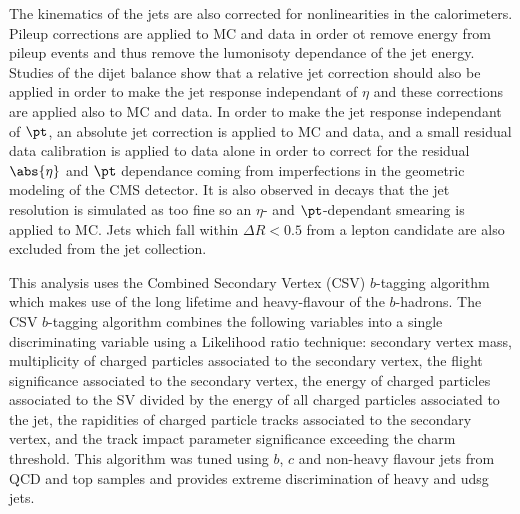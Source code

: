 The kinematics of the jets are also corrected for nonlinearities 
in the calorimeters.
Pileup corrections are applied to MC and data in order ot remove 
energy from pileup events and thus remove the lumonisoty dependance 
of the jet energy.
Studies of the dijet balance show that a relative jet correction 
should also be applied in order to make the jet response independant
of $\eta$ and these corrections are applied also to MC and data.
In order to make the jet response independant of $\pt$, an absolute
jet correction is applied to MC and data, and a small residual 
data calibration is applied to data alone in order to correct for the 
residual $\abs{\eta}$ and $\pt$ dependance coming from imperfections
in the geometric modeling of the CMS detector.
It is also observed in \MyZ  decays that the jet resolution is 
simulated as too fine so an $\eta$- and $\pt$-dependant smearing
is applied to MC. Jets which fall within $\Delta R < 0.5$ from a lepton candidate 
are also excluded from the jet collection.

This analysis uses the Combined Secondary Vertex (CSV) $b$-tagging algorithm which makes use 
of the long lifetime and heavy-flavour of the $b$-hadrons.  
The CSV $b$-tagging algorithm combines the following variables into a single discriminating 
variable using a Likelihood ratio technique: secondary vertex mass, multiplicity of charged 
particles associated to the secondary vertex, the flight significance associated to the
secondary vertex, the energy of charged particles associated to the SV divided by the energy 
of all charged particles associated to the jet, the rapidities of charged particle tracks associated
to the secondary vertex, and the track impact parameter significance exceeding the charm threshold.
This algorithm was tuned 
using $b$, $c$ and non-heavy flavour jets from QCD and top samples and provides extreme discrimination 
of heavy and udsg jets. 



